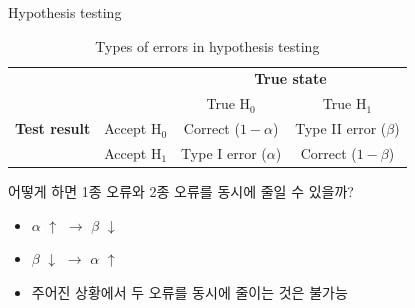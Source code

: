 \documentclass[9pt,ignorenonframetext,xcolor=dvipsnames]{beamer}
\providecommand{\tightlist}{%
  \setlength{\itemsep}{0pt}\setlength{\parskip}{0pt}}
\newlength{\wideitemsep}
\let\olditem\item
\renewcommand{\item}{\setlength{\itemsep}{\wideitemsep}\olditem}
\begin{document}
\begin{frame}{Hypothesis testing}

\begin{table}
  \centering
  \caption{Types of errors in hypothesis testing}
  \begingroup\footnotesize
  \begin{tabular}{cccc}
  \toprule
                              &                         & \multicolumn{2}{c}{\textbf{True state}} \\ \cmidrule(l){3-4}
                              &                         & True $\mathrm{H}_{0}$    & True $\mathrm{H}_{1}$ \\
  \midrule
  \textbf{Test result}       & Accept $\mathrm{H}_{0}$  & Correct ($1-\alpha$)     & Type II error ($\beta$)\\
                             & Accept $\mathrm{H}_{1}$  & Type I error ($\alpha$)  &  Correct ($1-\beta$) \\
  \bottomrule                  
  \end{tabular}
  \endgroup
\end{table}

어떻게 하면 1종 오류와 2종 오류를 동시에 줄일 수 있을까?

\begin{itemize}
\tightlist
\item
  \(\alpha\) \(\uparrow\) \(\rightarrow\) \(\beta\) \(\downarrow\)
\item
  \(\beta\) \(\downarrow\) \(\rightarrow\) \(\alpha\) \(\uparrow\)
\item
  주어진 상황에서 두 오류를 동시에 줄이는 것은 불가능
\end{itemize}

\end{frame}
\end{document}
